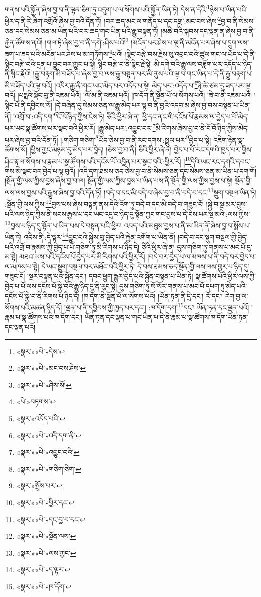 གནས་པའི་སྐྱོན་ཞེས་བྱ་བ་ནི་ལྷན་ཅིག་ཏུ་འདུག་པ་ལ་སོགས་པའི་སྐྱོན་ཡིན་ཏེ། དེས་ན་དེའི་\footnote{«སྣར་»«པེ་»དེས་}ཉེས་པ་ཡིན་པའི་ཕྱིར་ད་ནི་རེ་ཞིག་འགྲོའོ་ཞེས་བྱ་བའི་དོན་ཏོ། །བར་ཆད་མང་ལ་གནོད་པ་དང་དགྲ་:མང་བས་ཞེས་\footnote{«སྣར་»«པེ་»མང་བས་ཤེས་}བྱ་བ་ནི་སེམས་ཅན་དང་སེམས་ཅན་མ་ཡིན་པའི་བར་ཆད་གང་ཡིན་པའི་རྒྱུ་བསྟན་ཏོ། །མཆི་བའི་སྐབས་དང་ལྡན་ན་ཞེས་བྱ་བ་ནི་རྐྱེན་ཚོགས་ནའོ། །གལ་ཏེ་ཞེས་བྱ་བ་ནི་དགེ་:ཤིས་པའོ།\footnote{«སྣར་»«པེ་»ཤིས་སོ།} །མངོན་པར་ཤེས་པ་ལྔ་ནི་མངོན་པར་ཤེས་པ་དྲུག་ལས་ཟག་པ་ཟད་པའི་མངོན་པར་ཤེས་པ་མ་གཏོགས་\footnote{«པེ་»བཏགས་}པའོ། །སྙིང་བརྩེ་བས་རྗེས་སུ་འབྲང་བའི་ཚུལ་གང་ལ་ཡོད་པ་དེ་ནི་སྙིང་བརྩེ་བའི་དྲན་པ་བྱུང་བར་གྱུར་པ་སྟེ། སྙིང་བརྩེ་བ་ནི་སྙིང་རྗེ་སྟེ། མི་དགེ་བའི་རྒྱུ་ལས་བཟློག་པར་འདོད་པ་ཉིད་ནི་སྙིང་རྗེའོ། །རྒྱུ་བརྟག་མི་བཟོད་པ་ཞེས་བྱ་བ་ལས་རྒྱུ་བསྟན་པར་མི་ནུས་པའི་ལྟ་བ་གང་ཡིན་པ་དེ་ནི་རྒྱུ་བརྟག་པ་མི་བཟོད་པའི་ལྟ་བའོ། །འདིར་རྒྱུ་ནི་གང་ཡང་མེད་པར་འདོད་པ་སྟེ། མེད་པར་:འདོད་པ་\footnote{«སྣར་»འདོད་པའི་}ཉི་ཚེ་ཙམ་དུ་ཟད་པར་ལྟ་བའོ། །པདྨའི་སྡོང་བུ་ནི་འཇམ་པའོ། །ལོ་མ་ནི་འཇམ་པའོ། །ཁ་དོག་ནི་སྔོན་པོ་ལ་སོགས་པའོ། །ཟེ་བ་ནི་འཇམ་པའོ། །སྙིང་པོ་ནི་དབྱིབས་སོ། །དེ་བཞིན་དུ་སེམས་ཅན་ལ་རྒྱུ་མེད་པར་ལྟ་བ་ནི་བྱའི་འདབ་མ་ཞེས་བྱ་བས་བསྟན་པ་ཡིན་ནོ། །འགྲོ་བ་:འདི་དག་\footnote{«སྣར་»«པེ་»འདི་དག་ནི་}ངོ་བོ་ཉིད་ཀྱིས་ངེས་ཏེ། ཅིའི་ཕྱིར་ཞེ་ན། ཕྱི་དང་ནང་གི་དངོས་པོ་རྣམས་ལ་བྱེད་པ་པོ་མེད་པར་ཡང་སྣ་ཚོགས་པར་སྣང་བའི་ཕྱིར་རོ། །རྒྱུ་མེད་པར་:འབྱུང་བར་\footnote{«སྣར་»«པེ་»འབྱུང་བའི་}མི་རིགས་ཞེས་བྱ་བ་ནི་ངོ་བོ་ཉིད་ཀྱིས་མེད་པར་ཞེས་བྱ་བའི་དོན་ཏོ། །:གཅིག་གཅིག་\footnote{«སྣར་»«པེ་»གཅིག་ཅིག་}ཡོད་ཅེས་བྱ་བ་ནི་རང་དགས་:སྤྲུལ་པར་\footnote{«སྣར་»སྤྲོས་པར་}བྱེད་པ་སྟེ། འཇིག་རྟེན་སྣ་ཚོགས་སོ། །ཕྱིས་ཀྱང་མཉམ་དུ་མེད་པར་བྱེད། །ཅེས་བྱ་བ་ནི། ཅིའི་ཕྱིར་ཞེ་ན། བྱེད་པ་པོ་རང་དགའི་ཁྱད་པར་གྱིས་ཤིང་རྟ་ལ་སོགས་པ་རྣམ་པ་སྣ་ཚོགས་པའི་དངོས་པོ་འབྱིན་པར་སྣང་བའི་:ཕྱིར་རོ། །\footnote{«སྣར་»«པེ་»ཕྱིར་དང་}དེའི་ཡང་རང་དགའི་དབང་གིས་མི་སྣང་བར་བྱེད་པ་ལྟ་བུའོ། །འདི་དག་ཐམས་ཅད་ཅེས་བྱ་བ་ནི་སེམས་ཅན་དང་སེམས་ཅན་མ་ཡིན་པ་དག་གོ། །སྔོན་གྱི་ལས་ཀྱིས་བྱས་ཞེས་བྱ་བ་ལ། སྔོན་གྱི་ལས་ཀྱིས་བྱས་པ་ཡིན་པས་ནི་སྔོན་གྱི་ལས་ཀྱིས་བྱས་པ་སྟེ། སྔོན་གྱི་ལས་ལས་བྱས་པའི་རྒྱུས་ཞེས་བྱ་བའི་དོན་ཏོ། །བདེ་བ་དང་མི་བདེ་བ་ཞེས་བྱ་བ་ནི་བདེ་བ་དང་\footnote{«སྣར་»«པེ་»དང་བྱ་བ་དང་}སྡུག་བསྔལ་ཡིན་ཏེ། :སྔོན་གྱི་ལས་ཀྱིས་\footnote{«སྣར་»«པེ་»སྔོན་ལས་}བྱས་པས་ཞེས་བསྟན་ནས་དེའི་འོག་ཏུ་བདེ་བ་དང་མི་བདེ་བ་གཟུང་ངོ། །སྐྱེ་བ་སྔ་མར་བྱས་པའི་ལས་ཉིད་ཀྱིས་ནི་སངས་རྒྱས་པ་དང་ཡང་འདྲ་བ་ཉིད་དུ་སྟོན་ཀྱང་གང་བྱས་པ་དེ་ངེས་པར་སྔ་མའི་:ལས་ཀྱིས་\footnote{«སྣར་»«པེ་»ལས་ཀྱང་}བྱས་པ་ཉིད་དུ་སྟོན་པ་ཡིན་པས་དེ་བསྟན་པའི་ཕྱིར། འབད་པའི་མཐུས་བྱས་པ་ནི་མ་ཡིན་ནོ་ཞེས་བྱ་བ་སྨོས་པ་ཡིན་ཏེ། འདིས་ནི་:དེ་ལྟར་\footnote{«སྣར་»«པེ་»ད་ལྟར་}བྱུང་བའི་སྐྱེས་བུ་བྱེད་པའི་རྐྱེན་འགོག་པ་ཡིན་ནོ། །བདེ་བ་དང་སྡུག་བསྔལ་གྱི་བྱེད་པའི་འགྲོ་བ་རྣམས་ཀྱི་བྱེད་པ་པོ་གཅིག་ཏུ་མི་རིགས་པ་ཉིད་དེ། ཅིའི་ཕྱིར་ཞེ་ན། དུས་གཅིག་ཏུ་གནས་པ་མང་པོ་དུ་མ་སྟེ། མཐའ་ཡས་པའི་དངོས་པོ་བྱེད་པར་མི་རིགས་པའི་ཕྱིར་རོ། །བདེ་བར་བྱེད་པ་ལ་མཁས་པ་ནི་བདེ་བར་བྱེད་པ་ལ་མཁས་པ་སྟེ། དེ་ཡང་སྡུག་བསྔལ་བར་མཐོང་བའི་ཕྱིར་ཏེ། དེ་བས་ཐམས་ཅད་སྔོན་གྱི་ལས་ལས་གྱུར་པ་ཉིད་དུ་གཟུང་ངོ། །སྔར་བསྟན་པའི་སྐྱོན་དང་། དབང་ཕྱུག་རྒྱུར་བྱེད་པའི་སྐྱོན་བསྟན་པ་ཡིན་ཏེ། སྣ་ཚོགས་པའི་ཕྱིར་ལས་ཀྱི་བྱེད་པ་པོ་ལས་དངོས་པོ་སྐྱེ་བའི་རྒྱུ་ཉིད་དུ་ནི་རུང་སྟེ། དུས་གཅིག་ཏུ་སོ་སོར་གནས་པ་མང་པོ་དཔག་ཏུ་མེད་པའི་དངོས་པོ་སྐྱེ་བ་ནི་རིགས་པ་ཉིད་དོ། །ཁ་དོག་ནི་སྔོན་པོ་ལ་སོགས་པའོ། །ཡོན་ཏན་ནི་དྲི་དང་། རོ་དང་། རེག་བྱ་ལ་སོགས་པའི་མཚན་ཉིད་དོ། །ལྡན་པ་ནི་དབྱིབས་ཀྱི་ཁྱད་པར་དང་། :ཁ་དོག་དག་\footnote{«སྣར་»«པེ་»ཁ་དོག་}དང་། ཡོན་ཏན་དང་ལྡན་པའོ། །རྣམ་པ་སྣ་ཚོགས་པའི་ཁ་དོག་དང་། ཡོན་ཏན་དང་ལྡན་པ་གང་ཡིན་པ་དེ་ནི་རྣམ་པ་སྣ་ཚོགས་ཁ་དོག་ཡོན་ཏན་དང་ལྡན་པའོ། 